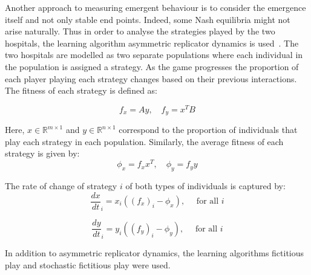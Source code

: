 Another approach to measuring emergent behaviour is to consider 
the emergence itself and not only stable end points. 
Indeed, some Nash equilibria might not arise naturally. 
Thus in order to analyse the strategies played by the two hospitals, the 
learning 
algorithm asymmetric replicator dynamics is 
used~\cite{asymmetricreplicatordynamics}.
The two hospitals are modelled as two separate populations where each 
individual in the population is assigned a strategy.
As the game progresses the proportion of each player playing each strategy 
changes based on their previous interactions.
The fitness of each strategy is defined as:

\begin{equation}\label{eq:asymmetric_fitness}
    f_x = Ay, \quad f_y = x^T B
\end{equation}

Here, \(x \in \mathbb{R}^{m \times 1} \) and
\(y \in \mathbb{R}^{n \times 1}\) correspond to the proportion of individuals 
that play each strategy in each population.
Similarly, the average fitness of each strategy is given by:
\begin{equation}
    \phi_x = f_x x^T, \quad \phi_y = f_y y
\end{equation}

The rate of change of strategy \( i \) of both types of individuals is captured 
by:
\begin{equation}
    \frac{dx}{dt}_i = x_i((f_x)_i - \phi_x), \quad \text{ for all }i
\end{equation}

\begin{equation}
    \frac{dy}{dt}_i = y_i((f_y)_i - \phi_y), \quad \text{ for all }i
\end{equation}
 
In addition to asymmetric replicator dynamics, the learning algorithms
fictitious play and stochastic fictitious play \cite{fudenberg1998theory}
were used.